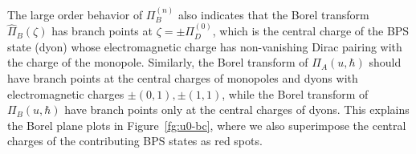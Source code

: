 \documentclass[a4paper,11pt]{article}
\theoremstyle{definition}
\newcommand{\ri}{{\rm i}}
\begin{document}
The large order behavior of $\Pi_B^{(n)}$ also indicates that the
Borel transform $\widehat \Pi_B(\zeta)$ has branch points at
$\zeta = \pm \Pi_D^{(0)}$, which is the central charge of the BPS
state (dyon) whose electromagnetic charge has non-vanishing Dirac
pairing with the charge of the monopole. Similarly, the Borel
transform of $\Pi_A(u,\hbar)$ should have branch points at the central
charges of monopoles and dyons with electromagnetic charges
$\pm(0,1), \pm(1,1)$, while the Borel transform of $\Pi_B(u,\hbar)$
have branch points only at the central charges of dyons. This explains
the Borel plane plots in Figure~\ref{fg:u0-bc}, where we also
superimpose the central charges of the contributing BPS states as red
spots.


\end{document}
